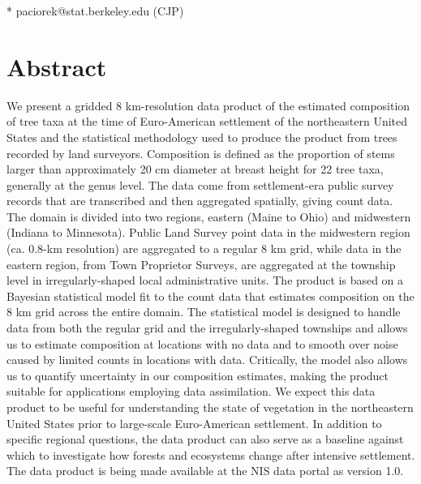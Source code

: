 \documentclass[10pt,letterpaper]{article}
\begin{document}
\begin{flushleft}



* paciorek@stat.berkeley.edu (CJP)




\end{flushleft}
\section*{Abstract}

We present a gridded 8 km-resolution data product of the estimated
composition of tree taxa at the time of Euro-American settlement of
the northeastern United States and the statistical methodology used
to produce the product from trees recorded by land surveyors. Composition
is defined as the proportion of stems larger than approximately 20
cm diameter at breast height for 22 tree taxa, generally at the genus
level. The data come from settlement-era public survey records that
are transcribed and then aggregated spatially, giving count data.
The domain is divided into two regions, eastern (Maine to Ohio) and
midwestern (Indiana to Minnesota). Public Land Survey point data in
the midwestern region (ca. 0.8-km resolution) are aggregated to a
regular 8 km grid, while data in the eastern region, from Town Proprietor
Surveys, are aggregated at the township level in irregularly-shaped
local administrative units. The product is based on a Bayesian statistical
model fit to the count data that estimates composition on the
8 km grid across the entire domain. The statistical model is designed
to handle data from both the regular grid and the irregularly-shaped
townships and allows us to estimate composition at locations with
no data and to smooth over noise caused by limited counts in locations
with data. Critically, the model also allows us to quantify uncertainty
in our composition estimates, making the product suitable for applications
employing data assimilation. We expect this data product to be useful
for understanding the state of vegetation in the northeastern United
States prior to large-scale Euro-American settlement. In addition
to specific regional questions, the data product can also serve as
a baseline against which to investigate how forests and ecosystems
change after intensive settlement. The data product is being made
available at the NIS data portal as version 1.0.
\end{document}
